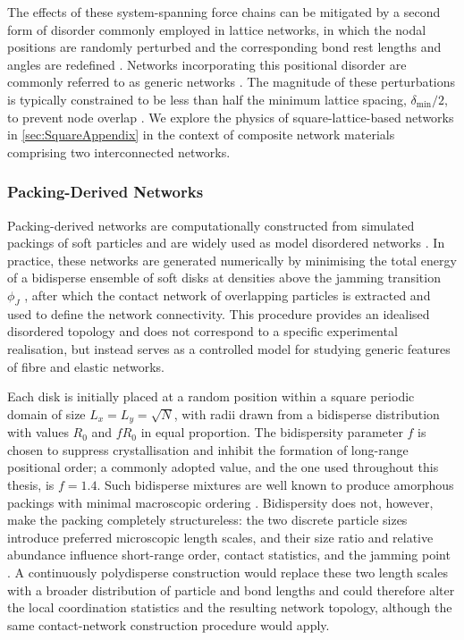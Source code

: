 The effects of these system-spanning force chains can be mitigated by a second form of disorder commonly employed in lattice networks, in which the nodal positions are randomly perturbed and the corresponding bond rest lengths and angles are redefined \cite{jacobs_generic_1995,krushynska_multi-frequency_2025,sheinman_nonlinear_2012,head_predicting_2025}. Networks incorporating this positional disorder are commonly referred to as generic networks \cite{jacobs_generic_1995}. The magnitude of these perturbations is typically constrained to be less than half the minimum lattice spacing, $\delta_{\min}/2$, to prevent node overlap \cite{shivers_normal_2019}. We explore the physics of square-lattice-based networks in \cref{sec:SquareAppendix} in the context of composite network materials comprising two interconnected networks.

\subsubsection{Packing-Derived Networks} \label{sec:PackingBasedNetworks}

Packing-derived networks are computationally constructed from simulated packings of soft particles and are widely used as model disordered networks \cite{rens_rigidity_2019,wyart_elasticity_2008,lerner_unified_2012,shivers_normal_2019,shivers_scaling_2019,shivers_phase_2022}. In practice, these networks are generated numerically by minimising the total energy of a bidisperse ensemble of soft disks at densities above the jamming transition $\phi_J$ \cite{Hernjamming2003,BoyerJamming2011,ikeda_unified_2012}, after which the contact network of overlapping particles is extracted and used to define the network connectivity. This procedure provides an idealised disordered topology and does not correspond to a specific experimental realisation, but instead serves as a controlled model for studying generic features of fibre and elastic networks.

Each disk is initially placed at a random position within a square periodic domain of size $L_x=L_y=\sqrt{N}$, with radii drawn from a bidisperse distribution with values $R_0$ and $fR_0$ in equal proportion. The bidispersity parameter $f$ is chosen to suppress crystallisation and inhibit the formation of long-range positional order; a commonly adopted value, and the one used throughout this thesis, is $f=1.4$. Such bidisperse mixtures are well known to produce amorphous packings with minimal macroscopic ordering \cite{van_hecke_jamming_2010, chacko_slow_2019, desmond_random_2009, koezeMappingJammingTransition2016}. Bidispersity does not, however, make the packing completely structureless: the two discrete particle sizes introduce preferred microscopic length scales, and their size ratio and relative abundance influence short-range order, contact statistics, and the jamming point \cite{koezeMappingJammingTransition2016}. A continuously polydisperse construction would replace these two length scales with a broader distribution of particle and bond lengths and could therefore alter the local coordination statistics and the resulting network topology, although the same contact-network construction procedure would apply.

